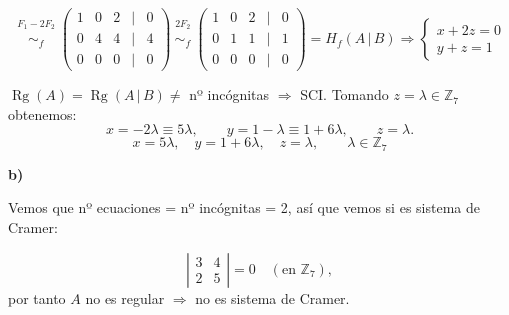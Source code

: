 \documentclass[a4paper,12pt]{article}
\begin{document}
\begin{ejercicio}[title=Ejercicio 26]
\[
\overset{\substack{F_1-2F_2\\{}}}{\sim_f}
\begin{pmatrix}
1 & 0 & 2 &\Big|& 0\\
0 & 4 & 4 &\Big|& 4\\
0 & 0 & 0 &\Big|& 0
\end{pmatrix}
\overset{\substack{2F_2\\{}}}{\sim_f}
\begin{pmatrix}
1 & 0 & 2 &\Big|& 0\\
0 & 1 & 1 &\Big|& 1\\
0 & 0 & 0 &\Big|& 0
\end{pmatrix}
= H_f(A\,|\,B)
\Rightarrow
\begin{cases}
x + 2z = 0\\[4pt]
y + z = 1
\end{cases}
\]

\vspace{0.5em}

$\operatorname{Rg}(A) = \operatorname{Rg}(A\,|\,B) \ne $ nº incógnitas $ \Rightarrow$ SCI. Tomando $z=\lambda\in\mathbb{Z}_7$ obtenemos:
\[
x = -2\lambda \equiv 5\lambda,\qquad y = 1-\lambda \equiv 1+6\lambda,\qquad z=\lambda.
\]
\[
\boxed{\,x = 5\lambda,\quad y = 1+6\lambda,\quad z = \lambda,\qquad \lambda\in\mathbb{Z}_7\,}
\]

\textbf{b)}

Vemos que nº ecuaciones = nº incógnitas = 2, así que vemos si es sistema de Cramer:

\[
\left|
\begin{matrix}
3 & 4\\
2 & 5
\end{matrix}
\right| = 0 \quad(\text{en } \mathbb{Z}_7),
\]
por tanto $A$ no es regular $\Rightarrow$ no es sistema de Cramer.
\end{ejercicio}
\end{document}
